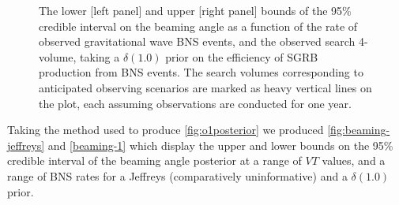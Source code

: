 \documentclass{kentigern}
\theoremstyle{definition}
\begin{document}
\begin{figure}[b]
  \checkoddpage
   
  \caption{
    The lower [left panel] and upper [right panel] bounds of
    the 95\% credible interval on the beaming angle as a function of
    the rate of observed gravitational wave BNS events, and the
    observed search 4-volume, taking a $\delta(1.0)$ prior on the
    efficiency of SGRB production from BNS events. The search volumes
    corresponding to anticipated observing scenarios are marked as
    heavy vertical lines on the plot, each assuming observations are
    conducted for one year.
    \label{fig:beaming-1}
    }
\end{figure}

Taking the method used to produce \ref{fig:o1posterior} we produced
\ref{fig:beaming-jeffreys} and \ref{beaming-1} which display the upper
and lower bounds on the 95\% credible interval of the beaming angle
posterior at a range of $VT$ values, and a range of BNS rates for a
Jeffreys (comparatively uninformative) and a $\delta(1.0)$ prior.
\end{document}
